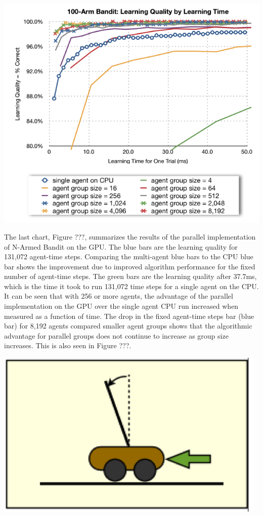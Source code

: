 \documentclass[11pt]{article} %
\begin{document}
\center
\includegraphics[scale=0.8]{fig04}
\begin{flushleft}

The last chart, Figure ???, summarizes the results of the parallel implementation of N-Armed Bandit on the GPU.  The blue bars are the learning quality for 131,072 agent-time steps.  Comparing the multi-agent blue bars to the CPU blue bar shows the improvement due to improved algorithm performance for the fixed number of agent-time steps.  The green bars are the learning quality after 37.7ms, which is the time it took to run 131,072 time steps for a single agent on the CPU.  It can be seen that with 256 or more agents, the advantage of the parallel implementation on the GPU over the single agent CPU run increased when measured as a function of time.  The drop in the fixed agent-time steps bar (blue bar) for 8,192 agents compared smaller agent groups shows that the algorithmic advantage for parallel groups does not continue to increase as group size increases.  This is also seen in Figure ???.

\end{flushleft}
\center
\includegraphics[scale=0.8]{fig06}
\end{document}

